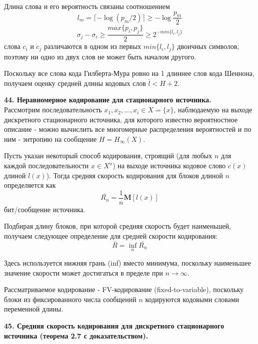 \documentclass[14pt]{article}
\begin{document}
Длина слова и его вероятность связаны соотношением
\begin{displaymath}
    l_m = \lceil -\log(p_m / 2) \rceil \geq -\log \frac{p_m}{2}
\end{displaymath}
\begin{displaymath}
    \sigma_j - \sigma_i \geq \frac{max\{p_i, p_j\}}{2} \geq 2^{-min\{l_i, l_j\}}
\end{displaymath}
слова \(c_i\) и \(c_j\) различаются в одном из первых \(min\{l_i, l_j\}\) двоичных символов, поэтому ни одно из двух слов не может быть началом другого.

Поскольку все слова кода Гилберта-Мура ровно на 1 длиннее слов кода Шеннона, получаем оценку средней длины кодовых слов \(\bar{l} < H + 2\).


\bigskip
\textbf{44. Неравномерное кодирование для стационарного источника.} \\

Рассмотрим последовательность \(x_1, x_2, \ldots, x_i \in X = \{x\}\), наблюдаемую на выходе дискретного стационарного источника, для которого известно вероятностное описание - можно вычислить все многомерные распределения вероятностей и по ним - энтропию на сообщение \(H = H_{\infty}(X)\).

Пусть указан некоторый способ кодирования, строящий (для любых \(n\) для каждой последовательности \(x \in X^n\)) на выходе источника кодовое слово \(c(x)\) длиной \(l(x)\)). Тогда средняя скорость кодирования для блоков длиной \(n\) определяется как
\begin{displaymath}
    \bar{R_n} = \frac{1}{n}\textbf{M}[l(x)]
\end{displaymath}
бит/сообщение источника.

Подбирая длину блоков, при которой средняя скорость будет наименьшей, получаем следующее определение для средней скорости кодирования:
\begin{displaymath}
    \bar{R} = \inf_{n}\bar{R_n}
\end{displaymath}

Здесь используется нижняя грань (inf) вместо минимума, поскольку наименьшее значение скорости может достигаться в пределе при \(n \to \infty\).

Рассматриваемое кодирование - FV-кодирование (fixed-to-variable), поскольку блоки из фиксированного числа сообщений \(n\) кодируются кодовыми словами переменной длины.


\bigskip
\textbf{45. Средняя скорость кодирования для дискретного стационарного источника (теорема 2.7 с доказательством).} \\
\end{document}
